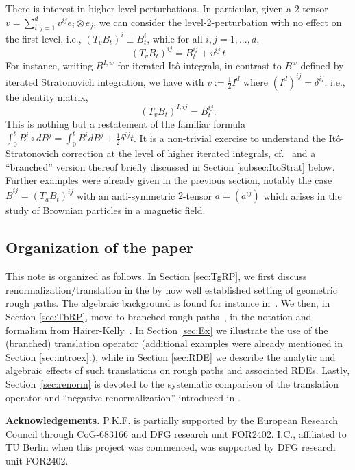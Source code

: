 \documentclass{article}
\begin{document}
There is interest in higher-level perturbations. In particular, given a $2$-tensor $v = \sum_{i,j=1}^d v^{ij} e_i \otimes e_j$, we can consider the level-2-perturbation with no effect on the first level, i.e., $(T_v B_t)^{i} \equiv B_t^{i}$, while for all $i,j=1,...,d$,
$$
        (T_v B_t)^{ij} = B_t^{ij} + v^{ij}\, t
$$
For instance, writing $B^{I;w}$ for iterated It\^{o} integrals, in contrast to $B^w$ defined by iterated Stratonovich integration, we have with $v := \frac{1}{2} I^d$ where $(I^d)^{ij} = \delta^{ij}$, i.e., the identity matrix,
$$
       (T_v B_t )^{I;ij} = B_t^{ij}.
$$
This is nothing but a restatement of the familiar formula $\int_0^t B^i \circ dB^j = \int_0^t B^i dB^j +\tfrac{1}{2} \delta^{ij} t $.
It is a non-trivial exercise to understand the It\^{o}-Stratonovich correction at the level of higher iterated integrals, cf.~\cite{BenArous89} and a ``branched'' version thereof briefly discussed in Section \ref{subsec:ItoStrat} below. Further examples were already given in the previous section, notably the case $\bar B^{ij} = (T_a B_t)^{ij}$ with an anti-symmetric $2$-tensor $a = (a^{ij})$ which arises in the study of Brownian particles in a magnetic field. 


\subsection{Organization of the paper}


This note is organized as follows. In Section \ref{sec:TgRP}, we first discuss renormalization/translation in the by now well established setting of geometric rough paths. The algebraic 
background is found for instance in~\cite{Reutenauer93}. We then, in Section \ref{sec:TbRP},  move to branched rough paths~\cite{Gubinelli10}, in the notation and formalism from Hairer-Kelly~\cite{HairerKelly15}. In Section \ref{sec:Ex} we illustrate the use of the (branched) translation operator (additional examples were already mentioned in Section 
\ref{sec:introex}.), while in Section \ref{sec:RDE} we describe the analytic and algebraic effects of such translations on rough paths and associated RDEs. Lastly, Section~\ref{sec:renorm} is devoted to the systematic comparison of the translation operator and ``negative renormalization'' introduced in \cite{BHZ16}.

\medskip

{\bf Acknowledgements.} P.K.F. is partially supported by the European Research Council through CoG-683166 and DFG research unit FOR2402. I.C., affiliated to TU Berlin when this project was commenced, was supported by DFG research unit FOR2402.
\end{document}
